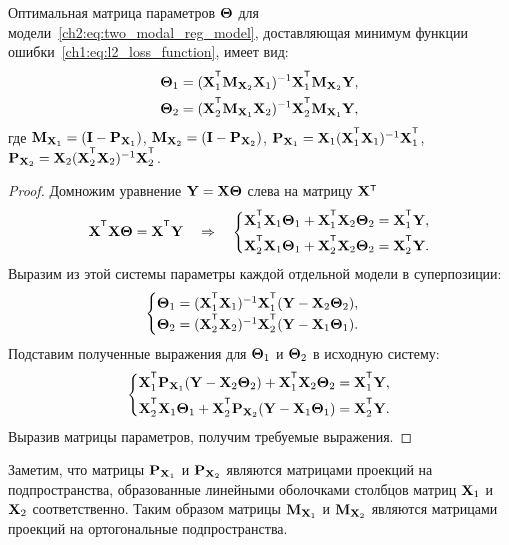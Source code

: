 \begin{statement}
	\label{ch2:stat:two_modal_params}
	Оптимальная матрица параметров $\boldsymbol{\Theta}$ для модели~\eqref{ch2:eq:two_modal_reg_model}, доставляющая минимум функции ошибки~\eqref{ch1:eq:l2_loss_function}, имеет вид:
	\begin{align*}
		\bTheta_1 &= (\bX_1^{\T} \bM_{\bX_2} \bX_1)^{-1} \bX_1^{\T} \bM_{\bX_2} \bY, \\
		\bTheta_2 &= (\bX_2^{\T} \bM_{\bX_1} \bX_2)^{-1} \bX_2^{\T} \bM_{\bX_1} \bY,
	\end{align*}
	где $\mathbf{M}_{\mathbf{X}_1} = (\mathbf{I} - \mathbf{P}_{\mathbf{X}_1})$, $\mathbf{M}_{\mathbf{X}_2} = (\mathbf{I} - \mathbf{P}_{\mathbf{X}_2})$, $\bP_{\bX_1} = \bX_1 (\bX_1^{\T} \bX_1)^{-1} \bX_1^{\T}$, $\bP_{\bX_2} = \bX_2 (\bX_2^{\T} \bX_2)^{-1} \bX_2^{\T}$.
\end{statement}
\begin{proof}
	Домножим уравнение $\mathbf{Y} = \mathbf{X} \boldsymbol{\Theta}$ слева на матрицу $\bX{\T}$
	\[
		\bX^{\T} \bX \bTheta = \bX^{\T} \bY \quad \Rightarrow \quad
		\begin{cases*}
			\bX_1^{\T} \bX_1 \bTheta_1 + \bX_1^{\T} \bX_2 \bTheta_2 = \bX_1^{\T} \bY, \\
			\bX_2^{\T} \bX_1 \bTheta_1 + \bX_2^{\T} \bX_2 \bTheta_2 = \bX_2^{\T} \bY.
		\end{cases*}
	\]
	Выразим из этой системы параметры каждой отдельной модели в суперпозиции:
	\[
		\begin{cases}
			\bTheta_1 = (\bX_1^{\T} \bX_1)^{-1} \bX_1^{\T} (\bY - \bX_2 \bTheta_2), \\
			\bTheta_2 = (\bX_2^{\T} \bX_2 )^{-1}  \bX_2^{\T} (\bY - \bX_1 \bTheta_1).
		\end{cases}
	\]
	Подставим полученные выражения для $\boldsymbol{\Theta}_1$ и $\boldsymbol{\Theta}_2$ в исходную систему:
	\[
				\begin{cases*}
					\bX_1^{\T} \bP_{\bX_1} (\bY - \bX_2 \bTheta_2) + \bX_1^{\T} \bX_2 \bTheta_2 = \bX_1^{\T} \bY, \\
					\bX_2^{\T} \bX_1 \bTheta_1 + \bX_2^{\T}\bP_{\bX_2} (\bY - \bX_1 \bTheta_1) = \bX_2^{\T} \bY.
				\end{cases*}
	\]
	Выразив матрицы параметров, получим требуемые выражения.
\end{proof}

Заметим, что матрицы $\mathbf{P}_{\mathbf{X}_1}$ и $\mathbf{P}_{\mathbf{X}_2}$ являются матрицами проекций на подпространства, образованные линейными оболочками столбцов матриц $\mathbf{X}_1$ и $\mathbf{X}_2$ соответственно.
Таким образом матрицы $\mathbf{M}_{\mathbf{X}_1}$ и $\mathbf{M}_{\mathbf{X}_2}$ являются матрицами проекций на ортогональные подпространства.

